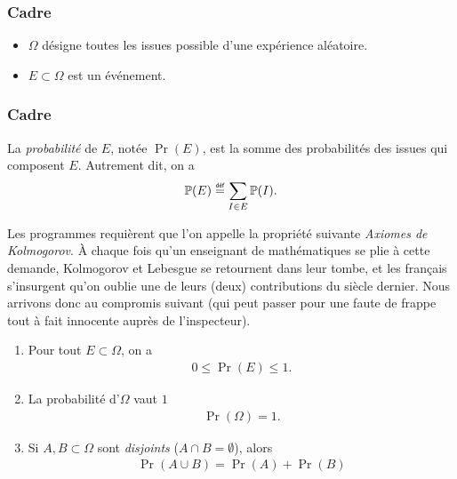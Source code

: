 \documentclass[main.tex]{subfiles}
\begin{document}
\begin{definition}

    \subsubsection{Cadre}
    \begin{itemize}
        \item $\Omega$ désigne toutes les issues possible d'une expérience aléatoire.
        \item $E \subset \Omega$ est un événement.
    \end{itemize}

    \subsubsection{Cadre}
    La \emph{probabilité} de $E$,
    notée $\Pr(E)$,
    est la somme des probabilités des issues qui composent $E$.
    Autrement dit,
    on a
    \begin{align}
        \Pr(E) \defeq \sum_{I \in E} \Pr(I).
    \end{align}
\end{definition}

Les programmes requièrent que l'on appelle la propriété suivante \emph{Axiomes de Kolmogorov}.
À chaque fois qu'un enseignant de mathématiques se plie à cette demande,
Kolmogorov et Lebesgue se retournent dans leur tombe,
et les français s'insurgent qu'on oublie une de leurs (deux) contributions du siècle dernier.
Nous arrivons donc au compromis suivant
(qui peut passer pour une faute de frappe tout à fait innocente auprès de l'inspecteur).

\begin{proposition}

    \begin{enumerate}
        \item Pour tout $E \subset \Omega$,
            on a
            \begin{align}
                0 \leq \Pr(E) \leq 1.
            \end{align}
        \item La probabilité d'$\Omega$ vaut $1$
            \begin{align}
                \Pr(\Omega) = 1.
            \end{align}
        \item Si $A, B \subset \Omega$ sont \emph{disjoints} ($A \cap B = \emptyset$),
            alors
            \begin{align}
                \Pr (A \cup B) = \Pr(A) + \Pr(B)
            \end{align}
    \end{enumerate}
\end{proposition}
\end{document}
